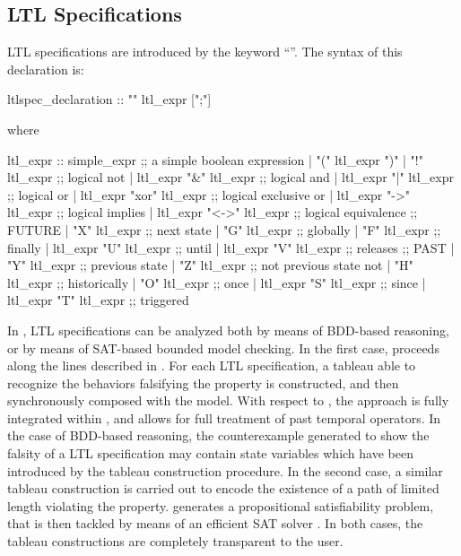\subsection{LTL Specifications}
\label{LTL Specifications}
%
LTL specifications are introduced by the keyword ``''. The syntax
of this declaration is:
%
\begin{Grammar}
ltlspec_declaration :: "" ltl_expr [";"]
\end{Grammar}
%
where
\begin{Grammar}
ltl_expr ::
    simple_expr                ;; a simple boolean expression
    | "(" ltl_expr ")"
    | "!" ltl_expr             ;; logical not
    | ltl_expr "&" ltl_expr    ;; logical and
    | ltl_expr "|" ltl_expr    ;; logical or
    | ltl_expr "xor" ltl_expr  ;; logical exclusive or
    | ltl_expr "->" ltl_expr   ;; logical implies
    | ltl_expr "<->" ltl_expr  ;; logical equivalence
    ;; FUTURE
    | "X" ltl_expr             ;; next state
    | "G" ltl_expr             ;; globally
    | "F" ltl_expr             ;; finally
    | ltl_expr "U" ltl_expr    ;; until
    | ltl_expr "V" ltl_expr    ;; releases
    ;; PAST
    | "Y" ltl_expr             ;; previous state
    | "Z" ltl_expr             ;; not previous state not
    | "H" ltl_expr             ;; historically
    | "O" ltl_expr             ;; once 
    | ltl_expr "S" ltl_expr    ;; since
    | ltl_expr "T" ltl_expr    ;; triggered
\end{Grammar}
%
In \nusmv, LTL specifications can be analyzed both by means of
BDD-based reasoning, or by means of SAT-based bounded model
checking. In the first case, \nusmv proceeds along the lines described
in \cite{CGH97}. For each LTL specification, a tableau able to
recognize the behaviors falsifying the property is constructed, and
then synchronously composed with the model. With respect to
\cite{CGH97}, the approach is fully integrated within \nusmv, and
allows for full treatment of past temporal operators.  In the case of
BDD-based reasoning, the counterexample generated to show the falsity
of a LTL specification may contain state variables which have been
introduced by the tableau construction procedure.
%
In the second case, a similar tableau construction is carried out to
encode the existence of a path of limited length violating the
property. \nusmv generates a propositional satisfiability problem,
that is then tackled by means of an efficient SAT solver
\cite{BCCZ99}.
%
In both cases, the tableau constructions are completely transparent to
the user.

